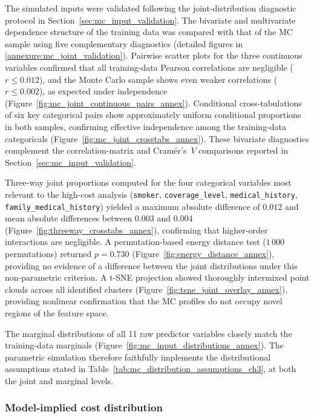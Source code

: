 The simulated inputs were validated following the joint-distribution
diagnostic protocol in Section~\ref{sec:mc_input_validation}.
The bivariate and multivariate dependence structure of the training data
was compared with that of the MC sample using five complementary
diagnostics (detailed figures in
\ref{annexure:mc_joint_validation}).  Pairwise scatter plots
for the three continuous variables confirmed that all training-data
Pearson correlations are negligible ($r \leq 0.012$), and the Monte
Carlo sample shows even weaker correlations ($r \leq 0.002$), as
expected under independence
(Figure~\ref{fig:mc_joint_continuous_pairs_annex}).  Conditional
cross-tabulations of six key categorical pairs show approximately
uniform conditional proportions in both samples, confirming effective
independence among the training-data categoricals
(Figure~\ref{fig:mc_joint_crosstabs_annex}).  These bivariate
diagnostics complement the correlation-matrix and Cram\'{e}r's~$V$
comparisons reported in Section~\ref{sec:mc_input_validation}.

Three-way joint proportions computed for the four categorical variables
most relevant to the high-cost analysis (\texttt{smoker},
\texttt{coverage\_\allowbreak{}level}, \texttt{medical\_\allowbreak{}history},
\texttt{family\_medical\_\allowbreak{}history}) yielded a maximum absolute difference
of $0.012$ and mean absolute differences between $0.003$ and $0.004$
(Figure~\ref{fig:threeway_crosstabs_annex}), confirming that
higher-order interactions are negligible.  A permutation-based energy
distance test ($1\,000$ permutations) returned $p = 0.730$
(Figure~\ref{fig:energy_distance_annex}), providing no evidence of a
difference between the joint distributions under this non-parametric
criterion.
A t-SNE projection showed thoroughly intermixed point clouds across all
identified clusters (Figure~\ref{fig:tsne_joint_overlay_annex}),
providing nonlinear confirmation that the MC profiles do not
occupy novel regions of the feature space.

The marginal distributions of all 11 raw predictor variables closely
match the training-data marginals
(Figure~\ref{fig:mc_input_distributions_annex}).  The parametric
simulation therefore faithfully implements the distributional assumptions
stated in Table~\ref{tab:mc_distribution_assumptions_ch3}, at both the
joint and marginal levels.

\subsubsection{Model-implied cost distribution}

